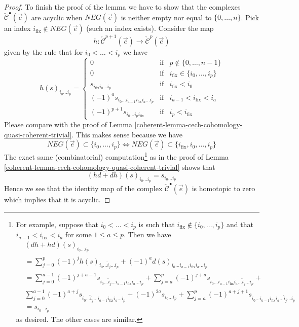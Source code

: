 \begin{proof}
\medskip\noindent
To finish the proof of the lemma we have to show that the complexes
$\check{\mathcal{C}}^\bullet(\vec{e})$ are acyclic when
$NEG(\vec{e})$ is neither empty nor equal to $\{0, \ldots, n\}$.
Pick an index $i_{\text{fix}} \not \in NEG(\vec{e})$ (such an index exists).
Consider the map
$$
h :
\check{\mathcal{C}}^{p + 1}(\vec{e})
\to
\check{\mathcal{C}}^p(\vec{e})
$$
given by the rule that for $i_0 < \ldots < i_p$ we have
$$
h(s)_{i_0 \ldots i_p} =
\left\{
\begin{matrix}
0 & \text{if} & p \not \in \{0, \ldots, n - 1\} \\
0 & \text{if} & i_{\text{fix}} \in \{i_0, \ldots, i_p\} \\
s_{i_{\text{fix}} i_0 \ldots i_p} & \text{if} & i_{\text{fix}} < i_0 \\
(-1)^a s_{i_0 \ldots i_{a - 1} i_{\text{fix}} i_a \ldots i_p} &
\text{if} & i_{a - 1} < i_{\text{fix}} < i_a \\
(-1)^{p + 1} s_{i_0 \ldots i_p i_{\text{fix}}} &
\text{if} & i_p < i_{\text{fix}}
\end{matrix}
\right.
$$
Please compare with the proof of
Lemma \ref{coherent-lemma-cech-cohomology-quasi-coherent-trivial}.
This makes sense because we have
$$
NEG(\vec{e}) \subset \{i_0, \ldots, i_p\}
\Leftrightarrow
NEG(\vec{e}) \subset \{i_{\text{fix}}, i_0, \ldots, i_p\}
$$
The exact same (combinatorial) computation\footnote{
For example, suppose that $i_0 < \ldots < i_p$ is such that
$i_{\text{fix}} \not \in \{i_0, \ldots, i_p\}$ and that
$i_{a - 1} < i_{\text{fix}} < i_a$ for some $1 \leq a \leq p$. Then we have
\begin{align*}
&
(dh + hd)(s)_{i_0 \ldots i_p} \\
& =
\sum\nolimits_{j = 0}^p
(-1)^j
h(s)_{i_0 \ldots \hat i_j \ldots i_p}
+
(-1)^a d(s)_{i_0 \ldots i_{a - 1} i_{\text{fix}} i_a \ldots i_p}\\
& =
\sum\nolimits_{j = 0}^{a - 1}
(-1)^{j + a - 1}
s_{i_0 \ldots \hat i_j \ldots i_{a - 1} i_{\text{fix}} i_a \ldots i_p} +
\sum\nolimits_{j = a}^p
(-1)^{j + a}
s_{i_0 \ldots i_{a - 1} i_{\text{fix}} i_a \ldots \hat i_j \ldots i_p}
+ \\
&
\sum\nolimits_{j = 0}^{a - 1}
(-1)^{a + j}
s_{i_0 \ldots \hat i_j \ldots i_{a - 1} i_{\text{fix}} i_a \ldots i_p} +
(-1)^{2a} s_{i_0 \ldots i_p} +
\sum\nolimits_{j = a}^p
(-1)^{a + j + 1}
s_{i_0 \ldots i_{a - 1} i_{\text{fix}} i_a \ldots \hat i_j \ldots i_p}
\\
& =
s_{i_0 \ldots i_p}
\end{align*}
as desired. The other cases are similar.}
as in the proof of Lemma \ref{coherent-lemma-cech-cohomology-quasi-coherent-trivial}
shows that
$$
(hd + dh)(s)_{i_0 \ldots i_p}
=
s_{i_0 \ldots i_p}
$$
Hence we see that the identity map of the complex
$\check{\mathcal{C}}^\bullet(\vec{e})$ is homotopic to zero
which implies that it is acyclic.
\end{proof}

